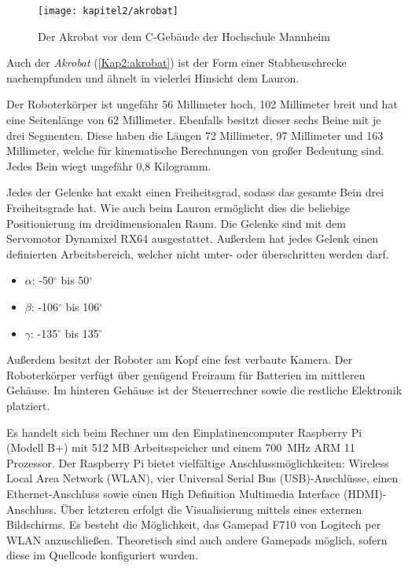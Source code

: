 \begin{figure}[b!]
  \centering
  \texttt{[image: kapitel2/akrobat]}
  \caption{Der Akrobat vor dem C-Gebäude der Hochschule Mannheim}
  \label{Kap2:akrobat}
\end{figure}

Auch der \emph{Akrobat} (\autoref{Kap2:akrobat}) ist der Form einer Stabheuschrecke nachempfunden und ähnelt in vielerlei Hinsicht dem Lauron.

Der Roboterkörper ist ungefähr 56 Millimeter hoch, 102 Millimeter breit und hat eine Seitenlänge von 62 Millimeter. Ebenfalls besitzt dieser sechs Beine mit je drei Segmenten. Diese haben die Längen 72 Millimeter, 97 Millimeter und 163 Millimeter, welche für kinematische Berechnungen von großer Bedeutung sind. Jedes Bein wiegt ungefähr 0,8 Kilogramm.

Jedes der Gelenke hat exakt einen Freiheitsgrad, sodass das gesamte Bein drei Freiheitsgrade hat. Wie auch beim Lauron ermöglicht dies die beliebige Positionierung im dreidimensionalen Raum. Die Gelenke sind mit dem Servomotor Dynamixel RX64 ausgestattet. Außerdem hat jedes Gelenk einen definierten Arbeitsbereich, welcher nicht unter- oder überschritten werden darf.
\begin{itemize}
  \item $\alpha$: -50$^\circ$ bis 50$^\circ$
  \item $\beta$: -106$^\circ$ bis 106$^\circ$
  \item $\gamma$: -135$^\circ$ bis 135$^\circ$
\end{itemize}  

Außerdem besitzt der Roboter am Kopf eine fest verbaute Kamera. Der Roboterkörper verfügt über genügend Freiraum für Batterien im mittleren Gehäuse. Im hinteren Gehäuse ist der Steuerrechner sowie die restliche Elektronik platziert.

Es handelt sich beim Rechner um den Einplatinencomputer Raspberry Pi (Modell B+) mit 512 MB Arbeitsspeicher und einem \SI{700}{MHz} ARM 11 Prozessor. Der Raspberry Pi bietet vielfältige Anschlussmöglichkeiten: Wireless Local Area Network (WLAN), vier Universal Serial Bus (USB)-Anschlüsse, einen Ethernet-Anschluss sowie einen High Definition Multimedia Interface (HDMI)-Anschluss. Über letzteren erfolgt die Visualisierung mittels eines externen Bildschirms. Es besteht die Möglichkeit, das Gamepad F710 von Logitech per WLAN anzuschließen. Theoretisch sind auch andere Gamepads möglich, sofern diese im Quellcode konfiguriert wurden. \autocite{askerow2014}

